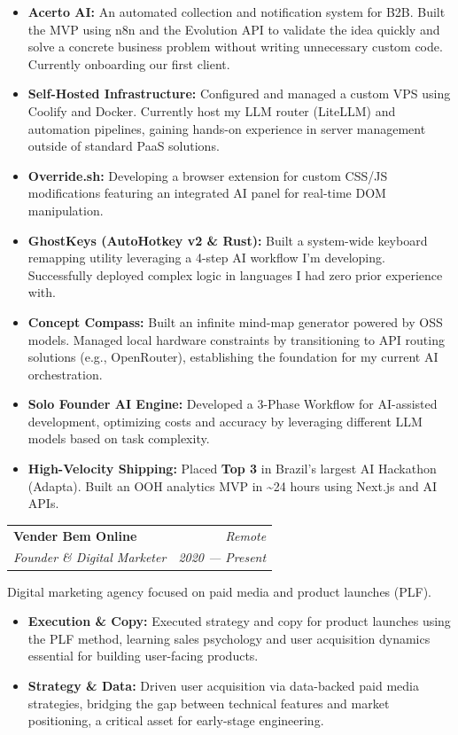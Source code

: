 \documentclass[11pt,letterpaper]{article}
\makeatletter
\newcommand{\resumeSubheading}[4]{%
  \vspace{0.12em}%
  \noindent
  \begin{tabular*}{\textwidth}{@{}p{0.68\textwidth}@{\extracolsep{\fill}}r@{}}
    {\bfseries #1} & {\textit{#2}} \\
    {\small\textit{#3}} & {\small\textit{#4}}
  \end{tabular*}%
  \par\vspace{0.06em}%
}
\makeatother
\begin{document}
\begin{itemize}
  \item \textbf{Acerto AI:} An automated collection and notification system for B2B. Built the MVP using n8n and the Evolution API to validate the idea quickly and solve a concrete business problem without writing unnecessary custom code. Currently onboarding our first client.
  \item \textbf{Self-Hosted Infrastructure:} Configured and managed a custom VPS using Coolify and Docker. Currently host my LLM router (LiteLLM) and automation pipelines, gaining hands-on experience in server management outside of standard PaaS solutions.
  \item \textbf{Override.sh:} Developing a browser extension for custom CSS/JS modifications featuring an integrated AI panel for real-time DOM manipulation.
  \item \textbf{GhostKeys (AutoHotkey v2 \& Rust):} Built a system-wide keyboard remapping utility leveraging a 4-step AI workflow I'm developing. Successfully deployed complex logic in languages I had zero prior experience with.
  \item \textbf{Concept Compass:} Built an infinite mind-map generator powered by OSS models. Managed local hardware constraints by transitioning to API routing solutions (e.g., OpenRouter), establishing the foundation for my current AI orchestration.
  \item \textbf{Solo Founder AI Engine:} Developed a 3-Phase Workflow for AI-assisted development, optimizing costs and accuracy by leveraging different LLM models based on task complexity.
  \item \textbf{High-Velocity Shipping:} Placed \textbf{Top 3} in Brazil's largest AI Hackathon (Adapta). Built an OOH analytics MVP in \textasciitilde24 hours using Next.js and AI APIs.
\end{itemize}

\resumeSubheading{Vender Bem Online}{Remote}{Founder \& Digital Marketer}{2020 --- Present}

Digital marketing agency focused on paid media and product launches (PLF).

\begin{itemize}
  \item \textbf{Execution \& Copy:} Executed strategy and copy for product launches using the PLF method, learning sales psychology and user acquisition dynamics essential for building user-facing products.
  \item \textbf{Strategy \& Data:} Driven user acquisition via data-backed paid media strategies, bridging the gap between technical features and market positioning, a critical asset for early-stage engineering.
\end{itemize}
\end{document}
